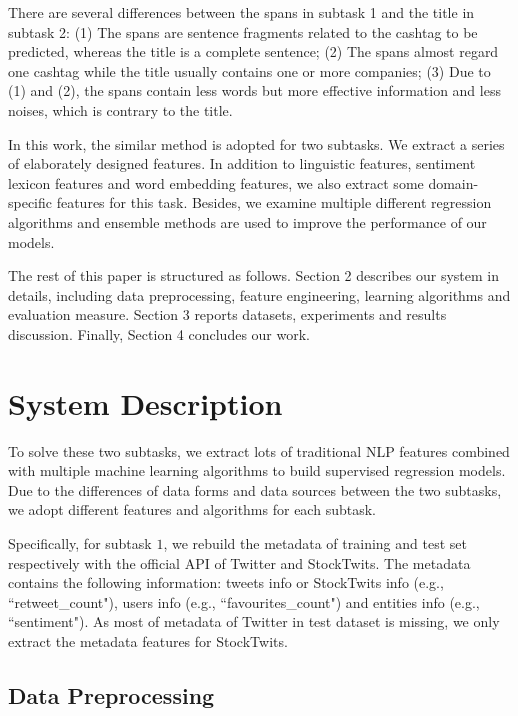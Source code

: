 \documentclass[11pt,a4paper]{article}
\begin{document}
There are several differences between the spans in subtask 1 and the title in subtask 2: (1) The spans are sentence fragments related to the cashtag to be predicted, whereas the title is a complete sentence; (2) The spans almost regard one cashtag while the title usually contains one or more companies; (3) Due to (1) and (2), the spans contain less words  but more effective information and less noises, which is contrary to the title.



In this work, the similar method is adopted for two subtasks. We extract a series of elaborately designed features. In addition to linguistic features, sentiment lexicon features and word embedding features, we also extract some domain-specific features for this task. Besides, we examine multiple different regression algorithms and ensemble methods are used to improve the performance of our models.



The rest of this paper is structured as follows. Section 2 describes our system in details, including data preprocessing, feature engineering, learning
algorithms and evaluation measure. Section 3 reports datasets, experiments and results discussion. Finally, Section 4 concludes our work.

\section{System Description}



To solve these two subtasks, we extract lots of traditional NLP features combined with multiple machine learning algorithms to build supervised regression models. Due to the differences of data forms and data sources between the two subtasks, we adopt different features and algorithms for each subtask.


Specifically, for subtask $1$, we rebuild the metadata of training and test set respectively with the official API of Twitter and StockTwits. The metadata contains the following information: tweets info or StockTwits info (e.g., ``retweet\_count"), users info (e.g., ``favourites\_count") and entities info (e.g., ``sentiment").  As most of metadata of Twitter in test dataset is missing, we only extract the metadata features for StockTwits.



\subsection{Data Preprocessing}
\end{document}

